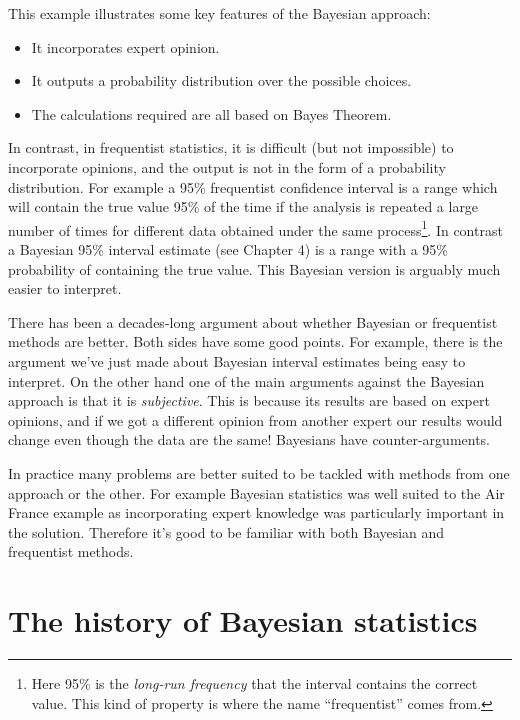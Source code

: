 This example illustrates some key features of the Bayesian approach:
\begin{itemize}
\item It incorporates expert opinion.
\item It outputs a probability distribution over the possible choices.
\item The calculations required are all based on Bayes Theorem.
\end{itemize}
In contrast, in frequentist statistics, it is difficult (but not impossible) to incorporate opinions, and the output is not in the form of a probability distribution.
For example a 95\% frequentist confidence interval is a range which will contain
the true value 95\% of the time if the analysis is repeated
a large number of times for different data obtained under
the same process\footnote{
Here 95\% is the \emph{long-run frequency} that the interval contains the correct value.
This kind of property is where the name ``frequentist'' comes from.
}.
In contrast a Bayesian 95\% interval estimate (see Chapter 4)
is a range with a 95\% probability of containing the true value.
This Bayesian version is arguably much easier to interpret.

There has been a decades-long argument about whether Bayesian or frequentist methods are better.
Both sides have some good points.
For example, there is the argument we've just made about Bayesian interval estimates being easy to interpret.
On the other hand one of the main arguments against the Bayesian approach is that it is \emph{subjective}.
This is because its results are based on expert opinions, and if we got a different opinion from another expert our results would change even though the data are the same!
Bayesians have counter-arguments.



In practice many problems are better suited to be tackled with methods from one approach or the other.
For example Bayesian statistics was well suited to the Air France example as incorporating expert knowledge was particularly important in the solution.
Therefore it's good to be familiar with both Bayesian and frequentist methods.

\section*{The history of Bayesian statistics}

